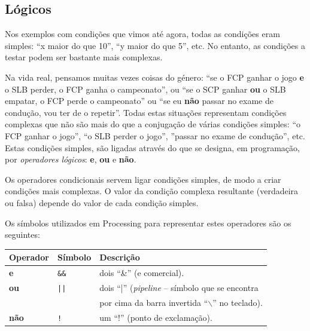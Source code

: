 \subsection{Lógicos} 
Nos exemplos com condições que vimos até agora, todas as condições eram simples: ``x maior do que 10'', ``y maior do que 5'', etc. No entanto, as condições a testar podem ser bastante mais complexas.

Na vida real, pensamos muitas vezes coisas do género: ``se o FCP ganhar o jogo \textbf{e} o SLB perder, o FCP ganha o campeonato'', ou ``se o SCP ganhar \textbf{ou} o SLB empatar, o FCP perde o campeonato'' ou ``se eu \textbf{não} passar no exame de condução, vou ter de o repetir''.
Todas estas situações representam condições complexas que não são mais do que a conjugação de várias condições simples: ``o FCP ganhar o jogo'', ``o SLB perder o jogo'', ''passar no exame de condução'', etc. Estas condições simples, são ligadas através do que se designa, em programação, por \emph{operadores lógicos}: \textbf{e}, \textbf{ou} e \textbf{não}. 

Os operadores condicionais servem ligar condições simples, de modo a criar condições mais complexas. O valor da condição complexa resultante (verdadeira ou falsa) depende do valor de cada condição simples.

Os símbolos utilizados em Processing para representar estes operadores são os seguintes:
\begin{center}
\begin{tabular}{lll}
Operador & Símbolo & Descrição\\
\hline
	\textbf{e} &\texttt{\&\&} &dois ``\&'' (e comercial).\\
	\textbf{ou} &\texttt{||} &dois ``|'' (\emph{pipeline} -- símbolo que se encontra\\
	& & por cima da barra invertida ``$\backslash$'' no teclado).\\
	\textbf{não} &\texttt{!} &um ``!'' (ponto de exclamação).\\
\end{tabular}
\end{center}

